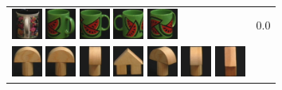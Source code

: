 \begin{figure}[tbp]
\begin{center}
\begin{tabular}{m{11cm} | m{3cm} |}
\includegraphics[width=1cm]{coil/beeld-65.eps}
\includegraphics[width=1cm]{coil/beeld-34.eps}
\includegraphics[width=1cm]{coil/beeld-30.eps}
\includegraphics[width=1cm]{coil/beeld-31.eps}
\includegraphics[width=1cm]{coil/beeld-33.eps}
& {\scriptsize 0.0}
\\
\includegraphics[width=1cm]{coil/beeld-0.eps}
\includegraphics[width=1cm]{coil/beeld-1.eps}
\includegraphics[width=1cm]{coil/beeld-5.eps}
\includegraphics[width=1cm]{coil/beeld-42.eps}
\includegraphics[width=1cm]{coil/beeld-4.eps}
\includegraphics[width=1cm]{coil/beeld-2.eps}
\includegraphics[width=1cm]{coil/beeld-44.eps}

\end{tabular}
\end{center}
\end{figure}
